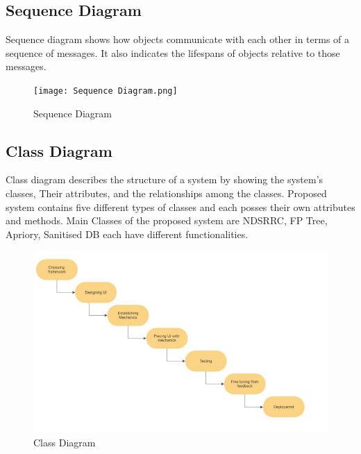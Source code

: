 \documentclass[12pt]{report}
\begin{document}
\justifying
\setlength{\parindent}{4em}
\setlength{\parskip}{0.5em}
\renewcommand{\baselinestretch}{1.5}
\normalsize
\subsection{Sequence Diagram}
Sequence diagram shows how objects communicate with each other in terms of a sequence 
of messages. It also indicates the lifespans of objects relative to those messages.
\vspace{1.5cm}
\begin{figure}[h]
\centering
\texttt{[image: Sequence Diagram.png]}
\caption{Sequence Diagram}
\label{Sequence Diagram}
\end{figure}

\clearpage
\justifying
\setlength{\parindent}{4em}
\setlength{\parskip}{0.5em}
\renewcommand{\baselinestretch}{1.5}
\normalsize
\subsection{ Class Diagram}
Class diagram describes the structure of a system by showing the system’s classes, Their
attributes, and the relationships among the classes. Proposed system contains five different 
types of classes and each posses their own attributes and methods. Main Classes of the 
proposed system are NDSRRC, FP Tree, Apriory, Sanitised DB each have different 
functionalities.
\vspace{1.5cm}
\begin{figure}[h]
\centering
\includegraphics[scale=0.9]{ Class Diagram.png}
\caption{ Class Diagram
}
\label{ Class Diagram
}
\end{figure}


\clearpage
\justifying
\setlength{\parindent}{4em}
\setlength{\parskip}{0.5em}
\renewcommand{\baselinestretch}{1.5}
\normalsize
\end{document}
